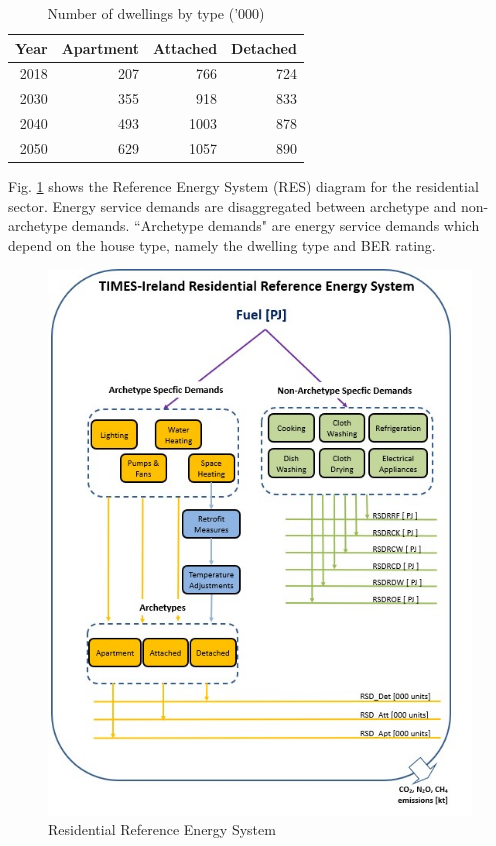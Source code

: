\documentclass[gmd,manuscript]{copernicus}
\begin{document}
\begin{table}[htbp]
  \centering
  \footnotesize
  \caption{Number of dwellings by type ('000)}
    \begin{tabular}{rrrr}
    \hline
    \multicolumn{1}{l}{Year} & \multicolumn{1}{l}{Apartment} & \multicolumn{1}{l}{Attached } & \multicolumn{1}{l}{Detached} \\ \hline
    2018  & 207   & 766   & 724 \\
    2030  & 355   & 918   & 833 \\
    2040  & 493   & 1003  & 878 \\
    2050  & 629   & 1057  & 890 \\ \hline
    \end{tabular}%
  \label{table: number of dwellings by type}%
\end{table}%


Fig. \ref{fig:TIM_RES} shows the Reference Energy System (RES) diagram for the residential sector. Energy service demands are disaggregated between archetype and non-archetype demands. ``Archetype demands" are energy service demands which depend on the house type, namely the dwelling type and BER rating. 
 
\begin{figure}[hb!]
 \centering
 \includegraphics[scale=3.2]{figures/TIM_Residential_RES.jpg} 
 \caption{Residential Reference Energy System}
 \label{fig:TIM_RES}
\end{figure}
\end{document}
